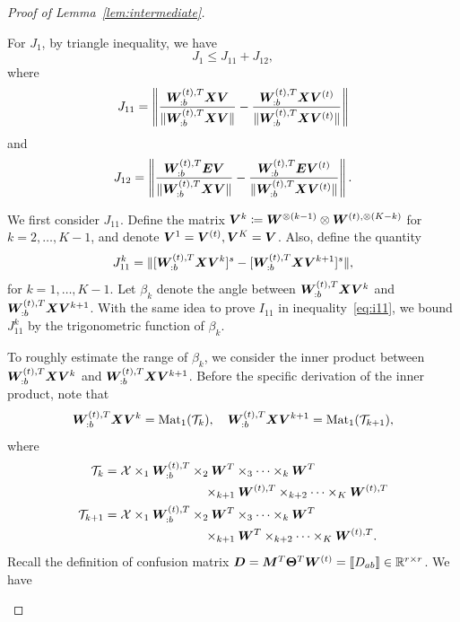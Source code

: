\documentclass[journal]{IEEEtran}
\theoremstyle{definition}
\theoremstyle{definition}
\begin{document}
\begin{proof}[Proof of Lemma~\ref{lem:intermediate}]
\begin{enumerate}[wide]
    For $J_1$, by triangle inequality,
we have 
    \begin{equation}
        J_1 \leq J_{11} + J_{12},
    \end{equation}
    where 
    \begin{equation}
        J_{11} =  \left\lVert \frac{\bm{W}_{:b}^{(t),T} \bm X \bm{V} }{\lVert \bm{W}_{:b}^{(t),T} \bm X \bm{V} \rVert} - \frac{\bm{W}_{:b}^{(t),T} \bm X \bm{V}^{(t)} }{\lVert \bm{W}_{:b}^{(t),T} \bm X \bm{V}^{(t)} \rVert}  \right\rVert
    \end{equation}
    and
    \begin{equation}
         J_{12} =  \left\lVert \frac{\bm{W}_{:b}^{(t),T}  \bm{E} \bm{V}}{ \lVert\bm{W}_{:b}^{(t),T}  \bm X \bm{V}\rVert } - \frac{\bm{W}_{:b}^{(t),T}  \bm{E} \bm{V}^{(t)}}{ \lVert\bm{W}_{:b}^{(t),T}  \bm X \bm{V}^{(t)}\rVert }   \right\rVert.
    \end{equation}
    
    We first consider $J_{11}$.  Define the matrix $\bm{V}^{k} \coloneqq \bm{W}^{\otimes (k-1)} \otimes \bm{W}^{(t), \otimes (K-k)}$ for $k = 2,\ldots, K-1$, and denote $\bm{V}^1 = \bm{V}^{(t)}, \bm{V}^K = \bm{V}$. Also, define the quantity
    \begin{equation}
        J_{11}^k = \lVert [\bm{W}_{:b}^{(t),T} \bm X \bm{V}^k ]^s - [\bm{W}_{:b}^{(t),T} \bm X \bm{V}^{k+1} ]^s \rVert,
     \end{equation}
    for $k = 1,\ldots, K-1$. Let $\beta_k$ denote the angle between $\bm{W}_{:b}^{(t),T} \bm X \bm{V}^k$ and $\bm{W}_{:b}^{(t),T} \bm X \bm{V}^{k+1}$. With the same idea to prove $I_{11}$ in inequality~\eqref{eq:i11}, we bound $J_{11}^k$ by the trigonometric function of $\beta_k$. 
    
    To roughly estimate the range of $\beta_k$, we consider the inner product between $\bm{W}_{:b}^{(t),T} \bm X \bm{V}^k$ and $\bm{W}_{:b}^{(t),T} \bm X \bm{V}^{k+1}$. Before the specific derivation of the inner product, note that 
    \begin{equation}
        \bm{W}_{:b}^{(t),T} \bm X \bm{V}^k = \text{Mat}_1(\mathcal{T}_k), \quad  \bm{W}_{:b}^{(t),T} \bm X \bm{V}^{k+1} = \text{Mat}_1(\mathcal{T}_{k+1}),
    \end{equation}
    where 
    \begin{align}
        \mathcal{T}_k &= \mathcal{X} \times_1  \bm{W}_{:b}^{(t),T} \times_2 \bm{W}^T \times_3 \cdots \times_k \bm{W}^T  \\
        & \quad \quad  \quad \quad \quad \quad \quad \quad \times_{k+1} \bm{W}^{(t),T} \times_{k+2} \cdots \times_K \bm{W}^{(t),T}\\
        \mathcal{T}_{k+1} &= \mathcal{X} \times_1  \bm{W}_{:b}^{(t),T} \times_2 \bm{W}^T \times_3 \cdots \times_k \bm{W}^T \\
        & \quad \quad  \quad \quad \quad \quad \quad \quad \times_{k+1} \bm{W}^{T} \times_{k+2} \cdots \times_K \bm{W}^{(t),T}. 
    \end{align}
    Recall the definition of confusion matrix $\bm{D} = \bm M^T \boldsymbol{\Theta}^T \bm{W}^{(t)} = \llbracket D_{ab} \rrbracket \in \mathbb{R}^{r \times r}$.
 We have 
 

\end{enumerate}
\end{proof}
\end{document}
